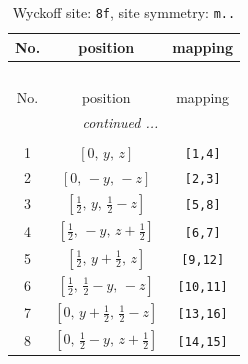 \documentclass[fleqn,8pt]{jsarticle}
\begin{document}
\begin{longtable}{ccc}
\caption{Wyckoff site: {\tt 8f}, site symmetry: {\tt m..}}
 \\
 \hline \hline
No. & position & mapping \\ \hline \endfirsthead

\multicolumn{2}{l}{\tablename\ \thetable{}} \\
 \hline \hline
No. & position & mapping \\ \hline \endhead

 \hline \hline
\multicolumn{2}{r}{\footnotesize\it continued ...} \\ \endfoot

 \hline \hline
\multicolumn{2}{r}{} \\ \endlastfoot

1 & $\left[ 0,\, y,\, z \right]$ & {\tt [1,4]} \\ \hline
2 & $\left[ 0,\, - y,\, - z \right]$ & {\tt [2,3]} \\ \hline
3 & $\left[ \frac{1}{2},\, y,\, \frac{1}{2} - z \right]$ & {\tt [5,8]} \\ \hline
4 & $\left[ \frac{1}{2},\, - y,\, z + \frac{1}{2} \right]$ & {\tt [6,7]} \\ \hline
5 & $\left[ \frac{1}{2},\, y + \frac{1}{2},\, z \right]$ & {\tt [9,12]} \\ \hline
6 & $\left[ \frac{1}{2},\, \frac{1}{2} - y,\, - z \right]$ & {\tt [10,11]} \\ \hline
7 & $\left[ 0,\, y + \frac{1}{2},\, \frac{1}{2} - z \right]$ & {\tt [13,16]} \\ \hline
8 & $\left[ 0,\, \frac{1}{2} - y,\, z + \frac{1}{2} \right]$ & {\tt [14,15]} \\
\end{longtable}
\renewcommand{\arraystretch}{1.2}
\end{document}
